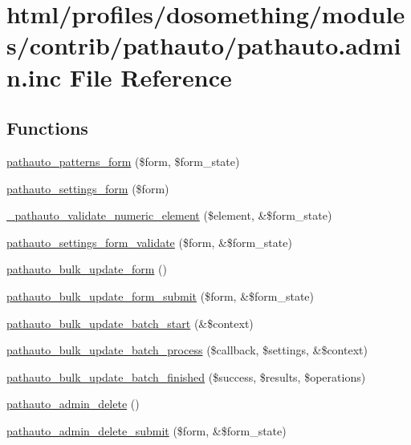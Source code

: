 \hypertarget{pathauto_8admin_8inc}{
\section{html/profiles/dosomething/modules/contrib/pathauto/pathauto.admin.inc File Reference}
\label{pathauto_8admin_8inc}
}
\subsection*{Functions}
\begin{DoxyCompactItemize}
\item 
\hyperlink{pathauto_8admin_8inc_a2b3adb295ed84c13148b9c34ce0b3b73}{pathauto\_\-patterns\_\-form} (\$form, \$form\_\-state)
\item 
\hyperlink{pathauto_8admin_8inc_a59b24f3617ff78cc8c9d8b3b4990b6e2}{pathauto\_\-settings\_\-form} (\$form)
\item 
\hyperlink{pathauto_8admin_8inc_adbd6f0b19fc224aa280c09e13ec53f9d}{\_\-pathauto\_\-validate\_\-numeric\_\-element} (\$element, \&\$form\_\-state)
\item 
\hyperlink{pathauto_8admin_8inc_ad27c29d292443ece46bfff41aee9c577}{pathauto\_\-settings\_\-form\_\-validate} (\$form, \&\$form\_\-state)
\item 
\hyperlink{pathauto_8admin_8inc_adbfac53f8f52a25ad1d4b1a59bf8b907}{pathauto\_\-bulk\_\-update\_\-form} ()
\item 
\hyperlink{pathauto_8admin_8inc_a34661ac29b8c6d623ed9437ad194cfa4}{pathauto\_\-bulk\_\-update\_\-form\_\-submit} (\$form, \&\$form\_\-state)
\item 
\hyperlink{pathauto_8admin_8inc_a7d546d06b26c9c05c3d69e74b729afc2}{pathauto\_\-bulk\_\-update\_\-batch\_\-start} (\&\$context)
\item 
\hyperlink{pathauto_8admin_8inc_a491859249088d2bd407d711cefc3f0aa}{pathauto\_\-bulk\_\-update\_\-batch\_\-process} (\$callback, \$settings, \&\$context)
\item 
\hyperlink{pathauto_8admin_8inc_aa4e5f7dbb4b2173c5851759c4c4a6ac0}{pathauto\_\-bulk\_\-update\_\-batch\_\-finished} (\$success, \$results, \$operations)
\item 
\hyperlink{pathauto_8admin_8inc_a5ab614f256c8e356b59a402461ad0d90}{pathauto\_\-admin\_\-delete} ()
\item 
\hyperlink{pathauto_8admin_8inc_a604d88306854d9908e302ead4896f77e}{pathauto\_\-admin\_\-delete\_\-submit} (\$form, \&\$form\_\-state)
\end{DoxyCompactItemize}


